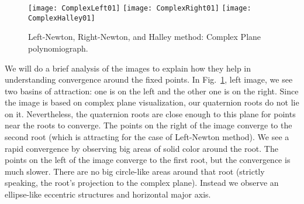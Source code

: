 \documentclass{article}
\theoremstyle{definition}
\begin{document}
\begin{figure}
\begin{center}
\texttt{[image: ComplexLeft01]}
\texttt{[image: ComplexRight01]}
\texttt{[image: ComplexHalley01]}
\caption{Left-Newton, Right-Newton, and Halley method: Complex Plane polynomiograph.}
\label{leftComplex}
\end{center}
\end{figure}

We will do a brief analysis of the images to explain how they help in understanding convergence around the fixed points. In  Fig.~\ref{leftComplex}, left image,  we see two basins of attraction: one is on the left and the other one is on the right. Since the image is based on complex plane visualization, our quaternion roots do not lie on it. Nevertheless, the quaternion roots are close enough to this plane for points near the roots to converge. The points on the right of the image converge to the second root (which is attracting for the case of Left-Newton method). We see a rapid convergence by observing big areas of solid color around the root. The points on the left of the image converge to the first root, but the convergence is much slower. There are no big circle-like areas around that root (strictly speaking, the root's projection to the complex plane). Instead we observe an ellipse-like eccentric structures and horizontal major axis.
\end{document}
